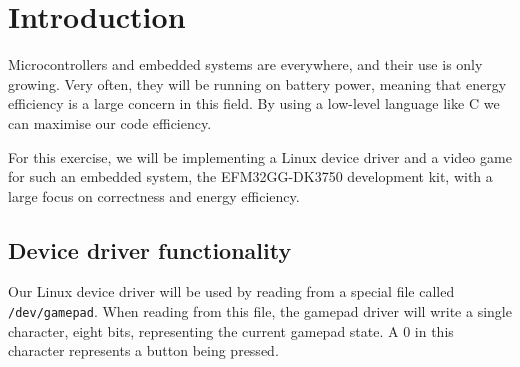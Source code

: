 \chapter{Introduction}



Microcontrollers and embedded systems are everywhere, and their use is only growing. Very often, they will be running on battery power, meaning that energy efficiency is a large concern in this field. By using a low-level language like C we can maximise our code efficiency.

For this exercise, we will be implementing a Linux device driver and a video game for such an embedded system, the EFM32GG-DK3750 development kit, with a large focus on correctness and energy efficiency.

\section{Device driver functionality}
Our Linux device driver will be used by reading from a special file called \texttt{/dev/gamepad}. When reading from this file, the gamepad driver will write a single character, eight bits, representing the current gamepad state. A 0 in this character represents a button being pressed.

